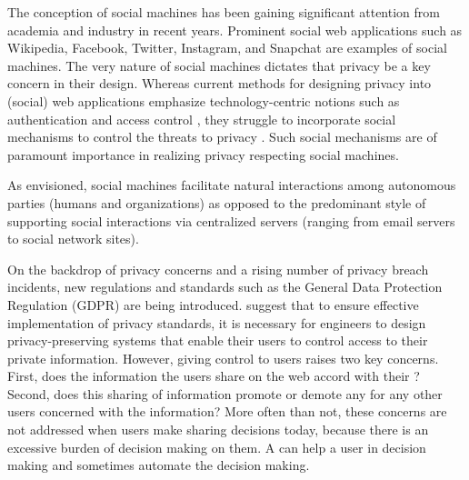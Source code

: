 The conception of social machines has been gaining significant attention from academia and industry in recent years. 
Prominent social web applications such as Wikipedia, Facebook, Twitter, Instagram, and Snapchat are examples of social machines.
The very nature of social machines dictates that privacy be a key concern in their design. 
Whereas current methods for designing privacy into (social) web applications emphasize technology-centric notions such as authentication \citep{Ruoti-WWW2015-AuthenticationMelee} and access control \citep{Paci-CSUR2018-CollaborativeAccessControl}, they struggle to incorporate social mechanisms to control the threats to privacy \citep{Hendler-AI2010-SocialMachine}. 
Such social mechanisms are of paramount importance in realizing privacy respecting social machines.

As envisioned, social machines facilitate natural interactions among autonomous parties (humans and organizations) as opposed to the predominant style of supporting social interactions via centralized servers (ranging from email servers to social network sites).


On the backdrop of privacy concerns and a rising number of privacy breach incidents, new regulations and standards such as the General Data Protection Regulation (GDPR) \citep{gdpr-18} are being introduced. 
\citet{spiekermann2009enggprivacy} suggest that to ensure effective implementation of privacy standards, it is necessary for engineers to design privacy-preserving systems that enable their users to control access to their private information. 
However, giving control to users raises two key concerns. 
First, does the information the users share on the web accord with their ? 
Second, does this sharing of information promote or demote any  for any other users concerned with the information? 
% 
More often than not, these concerns are not addressed when users make sharing decisions today, because there is an excessive burden of decision making on them. 
A  can help a user in decision making and sometimes automate the decision making. 

